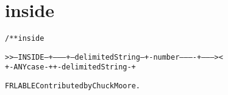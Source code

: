 \section{inside}
\begin{shaded}
\begin{alltt}
/** inside


   >>--INSIDE---+---------+--delimitedString--+-number----------+---------><
                +-ANYcase-+                   +-delimitedString-+


  FRLABLE Contributed by Chuck Moore.

\end{alltt}
\end{shaded}
